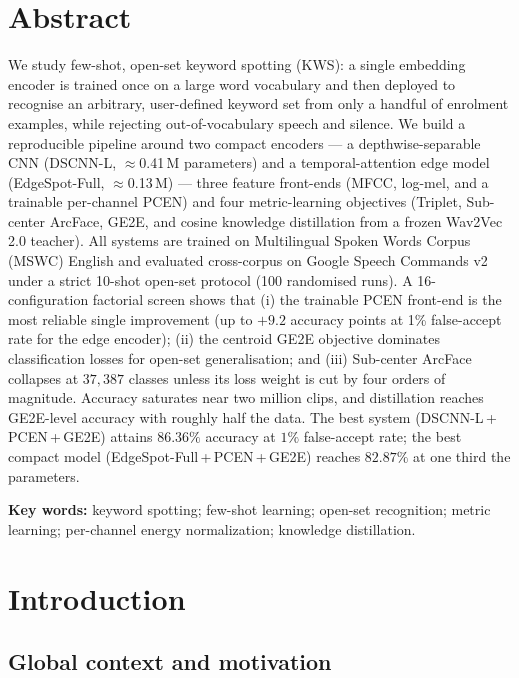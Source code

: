 \documentclass[12pt,a4paper]{article}
\begin{document}
\section*{Abstract}

We study few-shot, open-set keyword spotting (KWS): a single embedding encoder
is trained once on a large word vocabulary and then deployed to recognise an
arbitrary, user-defined keyword set from only a handful of enrolment examples,
while rejecting out-of-vocabulary speech and silence. We build a reproducible
pipeline around two compact encoders --- a depthwise-separable CNN (DSCNN-L,
$\approx$0.41\,M parameters) and a temporal-attention edge model (EdgeSpot-Full,
$\approx$0.13\,M) --- three feature front-ends (MFCC, log-mel, and a trainable
per-channel PCEN) and four metric-learning objectives (Triplet, Sub-center
ArcFace, GE2E, and cosine knowledge distillation from a frozen Wav2Vec\,2.0
teacher). All systems are trained on Multilingual Spoken Words Corpus (MSWC)
English and evaluated cross-corpus on Google Speech Commands v2 under a strict
10-shot open-set protocol (100 randomised runs). A 16-configuration factorial
screen shows that (i) the trainable PCEN front-end is the most reliable single
improvement (up to $+9.2$ accuracy points at 1\% false-accept rate for the edge
encoder); (ii) the centroid GE2E objective dominates classification losses for
open-set generalisation; and (iii) Sub-center ArcFace collapses at $37{,}387$
classes unless its loss weight is cut by four orders of magnitude. Accuracy
saturates near two million clips, and distillation reaches GE2E-level accuracy
with roughly half the data. The best system (DSCNN-L\,+\,PCEN\,+\,GE2E) attains
$86.36\%$ accuracy at $1\%$ false-accept rate; the best compact model
(EdgeSpot-Full\,+\,PCEN\,+\,GE2E) reaches $82.87\%$ at one third the parameters.

\vspace{0.4cm}
\noindent\textbf{Key words:} keyword spotting; few-shot learning; open-set
recognition; metric learning; per-channel energy normalization; knowledge
distillation.

\newpage
\tableofcontents
\newpage

\section{Introduction}\label{sec:intro}

\subsection{Global context and motivation}\label{sec:context}
\end{document}
